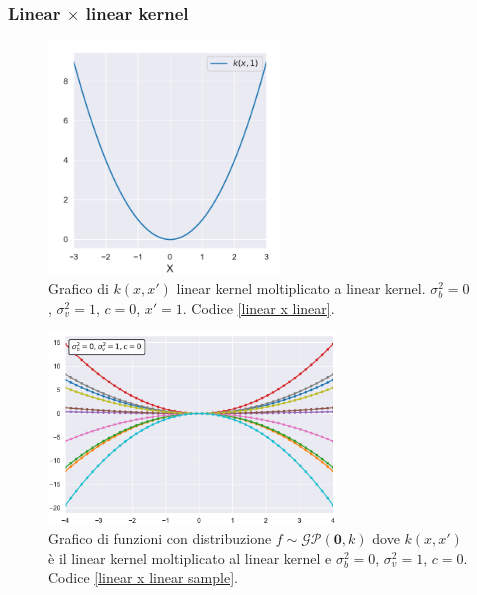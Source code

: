 \subsubsection{Linear $\times$ linear kernel}

\begin{figure}[h]
    \centering
    \includegraphics[width=0.55\textwidth]{images/Gaussian process/Linear x Linear kernel.pdf}
    \caption{Grafico di $k(x,x')$ linear kernel moltiplicato a linear kernel. $\sigma_b^2=0$, $\sigma_v^2=1$, $c=0$, $x'=1$. Codice \ref{linear x linear}.}
    \label{linear * linear kernel}
\end{figure}


\begin{figure}[h]
    \centering
    \includegraphics[width=0.68\textwidth]{images/Gaussian process/linear x linear sample.pdf}
    \caption{Grafico di funzioni con distribuzione  $f\sim \mathcal{GP}(\bm{0},k)$ dove $k(x,x')$ è il linear kernel moltiplicato al linear kernel e $\sigma_b^2=0$, $\sigma_v^2=1$, $c=0$. Codice \ref{linear x linear sample}.}
    \label{linear * linear sample}
\end{figure}


